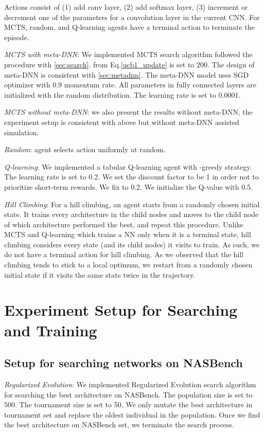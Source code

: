 \documentclass[10pt,twocolumn,letterpaper]{article}
\begin{document}
Actions consist of (1) add conv layer, (2) add softmax layer, (3) increment or decrement one of the parameters for a convolution layer in the current CNN.
For MCTS, random, and Q-learning agents have a terminal action to terminate the episode.

\textit{MCTS with meta-DNN}: We implemented MCTS search algorithm followed the procedure with \ref{sec:search}.  from Eq.\ref{ucb1_update} is set to 200. The design of meta-DNN is consistent with \ref{sec:metadnn}. The meta-DNN model uses SGD optimizer with 0.9 momentum rate. All parameters in fully connected layers are initialized with the random distribution. The learning rate is set to 0.0001.

\textit{MCTS without meta-DNN}: we also present the results without meta-DNN, the experiment setup is consistent with above but without meta-DNN assisted simulation.

\textit{Random}: agent selects action uniformly at random.

\textit{Q-learning}: We implemented a tabular Q-learning agent with -greedy strategy.
The learning rate is set to 0.2. We set the discount factor to be 1 in order not to prioritize short-term rewards. We fix  to 0.2.
We initialize the Q-value with 0.5.

\textit{Hill Climbing}: For a hill climbing, an agent starts from a randomly chosen initial state. It trains every architecture in the child nodes and moves to the child node of which architecture performed the best, and repeat this procedure. Unlike MCTS and Q-learning which trains a NN only when it is a terminal state, hill climbing considers every state (and its child nodes) it visits to train. As such, we do not have a terminal action for hill climbing.
As we observed that the hill climbing tends to stick to a local optimum, we restart from a randomly chosen initial state if it visits the same state twice in the trajectory.

\section{Experiment Setup for Searching and Training}
\label{ap:experiment_setup}

\subsection{Setup for searching networks on NASBench}

\textit{Regularized Evolution}: We implemented Regularized Evolution\cite{real2018regularized} search algorithm for searching the best architecture on NASBench. The population size is set to 500. The tournament size is set to 50. We only mutate the best architecture in tournament set and replace the oldest individual in the population. Once we find the best architecture on NASBench set, we terminate the search process.
\end{document}
